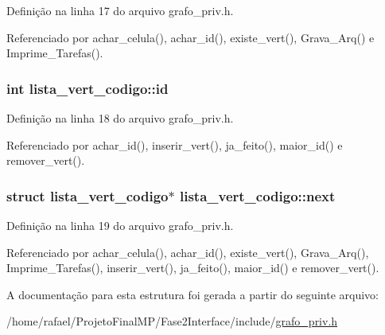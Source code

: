 Definição na linha 17 do arquivo grafo\+\_\+priv.\+h.



Referenciado por achar\+\_\+celula(), achar\+\_\+id(), existe\+\_\+vert(), Grava\+\_\+\+Arq() e Imprime\+\_\+\+Tarefas().

\hypertarget{structlista__vert__codigo_acc7c3bce66ab242ba6e64e763dfb63b3}{}
\subsubsection[{id}]{\setlength{\rightskip}{0pt plus 5cm}int lista\+\_\+vert\+\_\+codigo\+::id}\label{structlista__vert__codigo_acc7c3bce66ab242ba6e64e763dfb63b3}


Definição na linha 18 do arquivo grafo\+\_\+priv.\+h.



Referenciado por achar\+\_\+id(), inserir\+\_\+vert(), ja\+\_\+feito(), maior\+\_\+id() e remover\+\_\+vert().

\hypertarget{structlista__vert__codigo_af1cac7f22cb6142a13bd1f9c41f4c0b5}{}
\subsubsection[{next}]{\setlength{\rightskip}{0pt plus 5cm}struct {\bf lista\+\_\+vert\+\_\+codigo}$\ast$ lista\+\_\+vert\+\_\+codigo\+::next}\label{structlista__vert__codigo_af1cac7f22cb6142a13bd1f9c41f4c0b5}


Definição na linha 19 do arquivo grafo\+\_\+priv.\+h.



Referenciado por achar\+\_\+celula(), achar\+\_\+id(), existe\+\_\+vert(), Grava\+\_\+\+Arq(), Imprime\+\_\+\+Tarefas(), inserir\+\_\+vert(), ja\+\_\+feito(), maior\+\_\+id() e remover\+\_\+vert().



A documentação para esta estrutura foi gerada a partir do seguinte arquivo\+:\begin{DoxyCompactItemize}
\item 
/home/rafael/\+Projeto\+Final\+M\+P/\+Fase2\+Interface/include/\hyperlink{grafo__priv_8h}{grafo\+\_\+priv.\+h}\end{DoxyCompactItemize}
